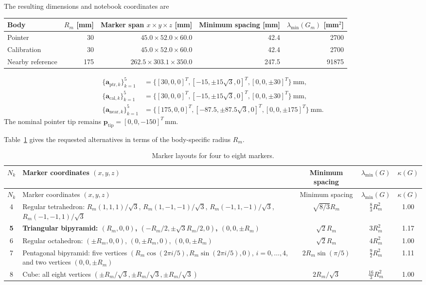 \documentclass[11pt]{article}
\newcommand{\vct}[1]{\bm{#1}}
\begin{document}
The resulting dimensions and notebook coordinates are
\begin{center}
\begingroup\scriptsize
\setlength{\tabcolsep}{4pt}
\begin{tabular}{lrrrr}
\toprule
Body & $R_m$ [mm] & Marker span $x\times y\times z$ [mm]
& Minimum spacing [mm] & $\lambda_{\min}(G_m)$ [mm$^2$] \\
\midrule
Pointer & 30 & $45.0\times52.0\times60.0$ & 42.4 & 2700 \\
Calibration & 30 & $45.0\times52.0\times60.0$ & 42.4 & 2700 \\
Nearby reference & 175 & $262.5\times303.1\times350.0$ & 247.5 & 91875 \\
\bottomrule
\end{tabular}
\endgroup
\end{center}
\begin{align}
\{\vct a_{\mathrm{ptr},k}\}_{k=1}^{5}
&=\{[30,0,0]^T,[-15,\pm15\sqrt3,0]^T,[0,0,\pm30]^T\}\ \mathrm{mm},\\
\{\vct a_{\mathrm{cal},k}\}_{k=1}^{5}
&=\{[30,0,0]^T,[-15,\pm15\sqrt3,0]^T,[0,0,\pm30]^T\}\ \mathrm{mm},\\
\{\vct a_{\mathrm{near},k}\}_{k=1}^{5}
&=\{[175,0,0]^T,[-87.5,\pm87.5\sqrt3,0]^T,[0,0,\pm175]^T\}\ \mathrm{mm}.
\end{align}
The nominal pointer tip remains
$\vct p_{\mathrm{tip}}=[0,0,-150]^T\,\mathrm{mm}$.

Table~\ref{tab:marker-count-alternatives} gives the requested alternatives in
terms of the body-specific radius $R_m$.

\begingroup\scriptsize
\setlength{\tabcolsep}{3pt}
\begin{longtable}{c p{} c c c}
\caption{Marker layouts for four to eight markers.}\label{tab:marker-count-alternatives}\\
\toprule
$N_k$ & Marker coordinates $(x,y,z)$
& Minimum spacing & $\lambda_{\min}(G)$ & $\kappa(G)$ \\\midrule
\endfirsthead
\toprule
$N_k$ & Marker coordinates $(x,y,z)$
& Minimum spacing & $\lambda_{\min}(G)$ & $\kappa(G)$ \\\midrule
\endhead
4 & Regular tetrahedron:
$R_m(1,1,1)/\sqrt3$, $R_m(1,-1,-1)/\sqrt3$,
$R_m(-1,1,-1)/\sqrt3$, $R_m(-1,-1,1)/\sqrt3$
& $\sqrt{8/3}R_m$ & $\frac83R_m^2$ & 1.00 \\\midrule
\textbf{5} & \textbf{Triangular bipyramid: $(R_m,0,0)$,
$(-R_m/2,\pm\sqrt3R_m/2,0)$, $(0,0,\pm R_m)$}
& $\sqrt2R_m$ & $3R_m^2$ & 1.17 \\\midrule
6 & Regular octahedron: $(\pm R_m,0,0)$, $(0,\pm R_m,0)$,
$(0,0,\pm R_m)$
& $\sqrt2R_m$ & $4R_m^2$ & 1.00 \\\midrule
7 & Pentagonal bipyramid: five vertices
$(R_m\cos(2\pi i/5),R_m\sin(2\pi i/5),0)$,
$i=0,\ldots,4$, and two vertices $(0,0,\pm R_m)$
& $2R_m\sin(\pi/5)$ & $\frac92R_m^2$ & 1.11 \\\midrule
8 & Cube: all eight vertices
$(\pm R_m/\sqrt3,\pm R_m/\sqrt3,\pm R_m/\sqrt3)$
& $2R_m/\sqrt3$ & $\frac{16}{3}R_m^2$ & 1.00 \\
\bottomrule
\end{longtable}
\endgroup
\end{document}
